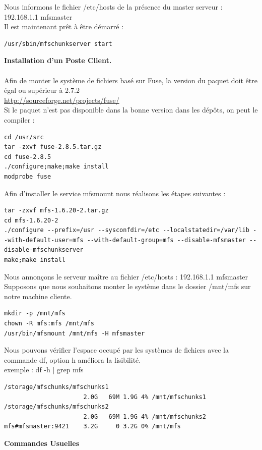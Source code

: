 \documentclass[12pt]{report}
\begin{document}
Nous informons le fichier /etc/hosts de la présence du master serveur : 192.168.1.1 mfsmaster\\
Il est maintenant prêt à être démarré :
  \begin{lstlisting}
/usr/sbin/mfschunkserver start
	  \end{lstlisting}
\textbf{Installation d'un Poste Client.}\\\\
Afin de monter le système de fichiers basé sur Fuse, la version du paquet doit être égal ou supérieur à 2.7.2\\
\href{http://sourceforge.net/projects/fuse/}{http://sourceforge.net/projects/fuse/} \\
Si le paquet n'est pas disponible dans la bonne version dans les dépôts, on peut le compiler :\\
  \begin{lstlisting}
cd /usr/src
tar -zxvf fuse-2.8.5.tar.gz
cd fuse-2.8.5
./configure;make;make install
modprobe fuse
	  \end{lstlisting}
\newpage
Afin d'installer le service mfsmount nous réalisons les étapes suivantes :
  \begin{lstlisting}
tar -zxvf mfs-1.6.20-2.tar.gz
cd mfs-1.6.20-2
./configure --prefix=/usr --sysconfdir=/etc --localstatedir=/var/lib --with-default-user=mfs --with-default-group=mfs --disable-mfsmaster --disable-mfschunkserver
make;make install
	  \end{lstlisting}
Nous annonçons le serveur maître au fichier /etc/hosts : 192.168.1.1   mfsmaster\\
Supposons que nous souhaitons monter le système dans le dossier /mnt/mfs sur notre machine cliente.\\
  \begin{lstlisting}
mkdir -p /mnt/mfs
chown -R mfs:mfs /mnt/mfs
/usr/bin/mfsmount /mnt/mfs -H mfsmaster
	  \end{lstlisting}
Nous pouvons vérifier l'espace occupé par les systèmes de fichiers avec la commande df, option h améliora la lisibilité.\\
exemple : df -h | grep mfs\\
  \begin{lstlisting}
/storage/mfschunks/mfschunks1
                      2.0G   69M 1.9G 4% /mnt/mfschunks1
/storage/mfschunks/mfschunks2
                      2.0G   69M 1.9G 4% /mnt/mfschunks2
mfs#mfsmaster:9421    3.2G     0 3.2G 0% /mnt/mfs
	  \end{lstlisting}
\textbf{Commandes Usuelles}\\\\
\end{document}
